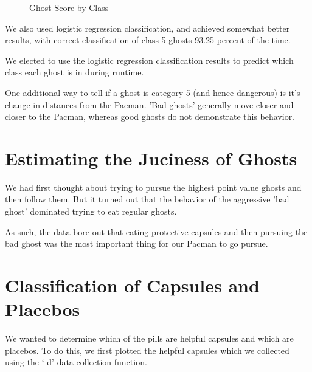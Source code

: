 \documentclass[11pt, oneside]{article}   	%
\begin{document}
\begin{figure}[h!]
  \centering
  \caption{Ghost Score by Class}
  \label{fig:ghosts}
 \end{figure}


We also used logistic regression classification, and achieved somewhat better results, with correct classification of class 5 ghosts 93.25 percent of the time.

We elected to use the logistic regression classification results to predict which class each ghost is in during runtime.

One additional way to tell if a ghost is category 5 (and hence dangerous) is it's change in distances from the Pacman. 'Bad ghosts' generally move closer and closer to the Pacman, whereas good ghosts do not demonstrate this behavior.

\section{Estimating the Juciness of Ghosts}

We had first thought about trying to pursue the highest point value ghosts and then follow them. But it turned out that the behavior of the aggressive 'bad ghost' dominated trying to eat regular ghosts.

As such, the data bore out that eating protective capsules and then pursuing the bad ghost was the most important thing for our Pacman to go pursue.

\section{Classification of Capsules and Placebos}
We wanted to determine which of the pills are helpful capsules and which are placebos. To do this, we first plotted the helpful capsules which we collected using the `-d' data collection function.
\end{document}

